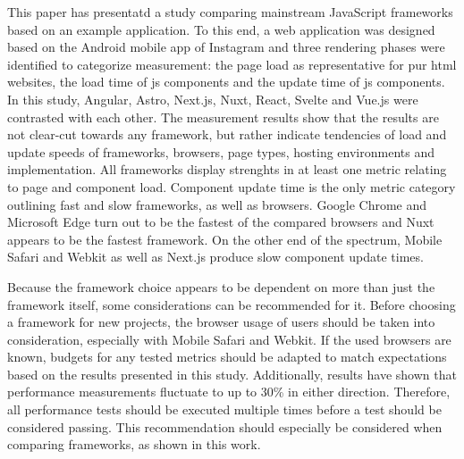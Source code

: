 \documentclass[a4paper, 12pt]{article}
\begin{document}
This paper has presentatd a study comparing mainstream JavaScript frameworks based on an example application.
To this end, a web application was designed based on the Android mobile app of Instagram and three rendering phases were identified to categorize measurement: the page load as representative for pur \acrshort{html} websites, the load time of \acrlong{js} components and the update time of \acrlong{js} components.
In this study, Angular, Astro, Next.js, Nuxt, React, Svelte and Vue.js were contrasted with each other.
The measurement results show that the results are not clear-cut towards any framework, but rather indicate tendencies of load and update speeds of frameworks, browsers, page types, hosting environments and implementation.
All frameworks display strenghts in at least one metric relating to page and component load.
Component update time is the only metric category outlining fast and slow frameworks, as well as browsers.
Google Chrome and Microsoft Edge turn out to be the fastest of the compared browsers and Nuxt appears to be the fastest framework.
On the other end of the spectrum, Mobile Safari and Webkit as well as Next.js produce slow component update times.

Because the framework choice appears to be dependent on more than just the framework itself, some considerations can be recommended for it.
Before choosing a framework for new projects, the browser usage of users should be taken into consideration, especially with Mobile Safari and Webkit.
If the used browsers are known, budgets for any tested metrics should be adapted to match expectations based on the results presented in this study.
Additionally, results have shown that performance measurements fluctuate to up to 30\% in either direction.
Therefore, all performance tests should be executed multiple times before a test should be considered passing.
This recommendation should especially be considered when comparing frameworks, as shown in this work.
\end{document}
